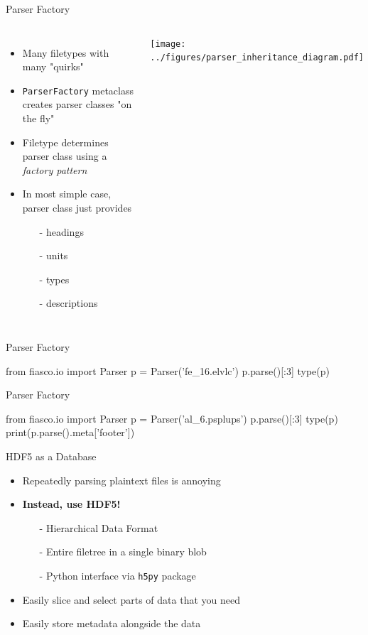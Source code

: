 \documentclass[12pt,aspectratio=169]{beamer}
\begin{document}
\begin{frame}{Parser Factory}
    \begin{columns}
            \begin{itemize}
                \item Many filetypes with many "quirks"
                \item \texttt{ParserFactory} metaclass creates parser classes "on the fly"
                \item Filetype determines parser class using a \emph{factory pattern}
                \item In most simple case, parser class just provides
                \begin{itemize}
                    \item[-] headings
                    \item[-] units
                    \item[-] types
                    \item[-] descriptions
                \end{itemize}
            \end{itemize}
            \texttt{[image: ../figures/parser\_inheritance\_diagram.pdf]}
    \end{columns}
\end{frame}
\begin{frame}[fragile]{Parser Factory}
\footnotesize
\begin{pyconsole}
from fiasco.io import Parser
p = Parser('fe_16.elvlc')
p.parse()[:3]
type(p)
\end{pyconsole}
\end{frame}
\begin{frame}[fragile]{Parser Factory}
\scriptsize
\begin{pyconsole}
from fiasco.io import Parser
p = Parser('al_6.psplups')
p.parse()[:3]
type(p)
print(p.parse().meta['footer'])
\end{pyconsole}
\end{frame}
\begin{frame}{HDF5 as a Database}
    \begin{itemize}
        \item Repeatedly parsing plaintext files is annoying
        \item \textbf{Instead, use HDF5!}
        \begin{itemize}
            \item[-] Hierarchical Data Format
            \item[-] Entire filetree in a single binary blob
            \item[-] Python interface via \texttt{h5py} package 
        \end{itemize}
        \item Easily slice and select parts of data that you need
        \item Easily store \alert{metadata alongside the data}
    \end{itemize}
\end{frame}
\end{document}
